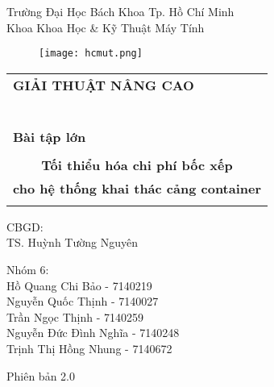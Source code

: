 \documentclass[11pt]{article}
\begin{document}
\begin{titlepage}
\begin{flushleft}
\noindent Trường Đại Học Bách Khoa Tp. Hồ Chí Minh\\
Khoa Khoa Học \& Kỹ Thuật Máy Tính\\
\end{flushleft}

\vspace{1cm}

\begin{figure}[h!]
\begin{center}
\texttt{[image: hcmut.png]}
\end{center}
\end{figure}

\vspace{1cm}


\begin{center}
\begin{tabular}{c}
\multicolumn{1}{l}{\textbf{{\Large GIẢI THUẬT NÂNG CAO}}}\\
~~\\
\hline
\\
\multicolumn{1}{l}{\textbf{{\Large Bài tập lớn}}}\\
\\
\textbf{{\Huge Tối thiểu hóa chi phí bốc xếp}}\\
\textbf{{\Huge cho hệ thống khai thác cảng container}}\\
\\
\hline
\end{tabular}
\end{center}

\vspace{3cm}

\vspace{3cm}

\begin{minipage}[t]{0.60\linewidth}
	CBGD:\\
	TS. Huỳnh Tường Nguyên
\end{minipage}
\begin{minipage}[t]{0.40\linewidth}
	Nhóm 6:\\
	Hồ Quang Chi Bảo - 7140219\\ 
	Nguyễn Quốc Thịnh - 7140027\\
	Trần Ngọc Thịnh - 7140259\\
	Nguyễn Đức Đình Nghĩa - 7140248\\
	Trịnh Thị Hồng Nhung - 7140672
\end{minipage}
\begin{center}
Phiên bản 2.0
\end{center}
\end{titlepage}
\end{document}
